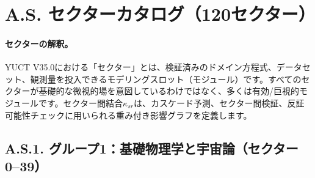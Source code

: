 \documentclass[13pt,a4paper]{ltjsarticle}
\begin{document}
	\section*{A.S. セクターカタログ（120セクター）}
	\label{sec:sector-catalog}
	\paragraph{セクターの解釈。}
	YUCT V35.0における「セクター」とは、検証済みのドメイン方程式、データセット、観測量を投入できるモデリングスロット（モジュール）です。すべてのセクターが基礎的な微視的場を意図しているわけではなく、多くは有効/巨視的モジュールです。セクター間結合$\kappa_{sr}$は、カスケード予測、セクター間検証、反証可能性チェックに用いられる重み付き影響グラフを定義します。
	
	\subsection*{A.S.1. グループ1：基礎物理学と宇宙論（セクター0--39）}
	
\end{document}
